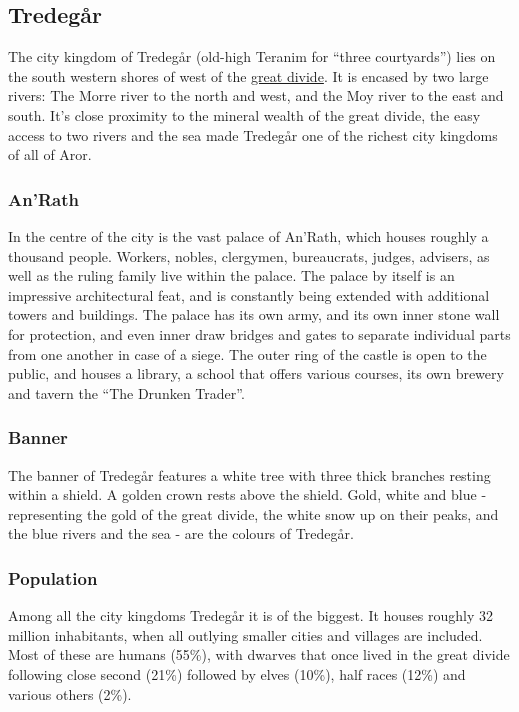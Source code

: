 \subsection{Tredegår}
\label{sec:Tredegar}

The city kingdom of Tredegår (old-high Teranim for ``three courtyards'')
lies on the south western shores of  west of the
\hyperref[sec:Great Divide]{great divide}. It is encased by two large rivers:
The Morre river to the north and west, and the Moy river to the
east and south. It's close proximity to the mineral wealth of the great
divide, the easy access to two rivers and the sea made Tredegår one of the
richest city kingdoms of all of Aror.

\subsubsection{An'Rath}
\label{sec:AnRath}

In the centre of the city is the vast palace of An'Rath, which houses roughly
a thousand people. Workers, nobles, clergymen, bureaucrats, judges, advisers,
as well as the ruling family live within the palace. The palace by itself is
an impressive architectural feat, and is constantly being extended with
additional towers and buildings. The palace has its own army, and its own
inner stone wall for protection, and even inner draw bridges and gates to
separate individual parts from one another in case of a siege. The outer ring
of the castle is open to the public, and houses a library, a school that
offers various courses, its own brewery and tavern the ``The Drunken Trader''.

\subsubsection{Banner}

The banner of Tredegår features a white tree with three thick branches resting
within a shield. A golden crown rests above the shield. Gold, white and blue -
representing the gold of the great divide, the white snow up on their peaks,
and the blue rivers and the sea - are the colours of Tredegår.

\subsubsection{Population}

Among all the city kingdoms Tredegår it is of the biggest. It houses roughly
32 million inhabitants, when all outlying smaller cities and villages are
included. Most of these are humans (55\%), with dwarves that once lived in the
great divide following close second (21\%) followed by elves (10\%), half
races (12\%) and various others (2\%).

